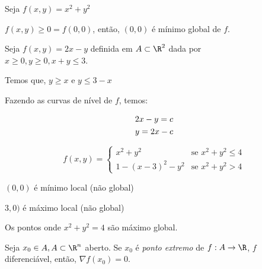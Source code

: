 \documentclass[11pt, oneside, a4paper]{gsm-l}
\begin{document}
\begin{exem}
Seja $f\left( {x,y} \right) = x^2  + y^2$
\end{exem}

\begin{sol}
$f\left( {x,y} \right) \geqslant 0 = f\left( {0,0} \right)$, então, $\left( {0,0} \right)$ é mínimo global de $f$.
\end{sol}

\begin{exem}
Seja $f\left( {x,y} \right) = 2x - y$ definida em $A \subset \R^2$ dada por \\
$x \geqslant 0,y \geqslant 0,x + y \leqslant 3$.
\end{exem}

\begin{sol}
Temos que, $y \geqslant x$ e $y \leqslant 3 - x$

Fazendo as curvas de nível de $f$, temos:

\[
\begin{gathered}
2x - y = c \hfill \\
y = 2x - c \hfill \\
\end{gathered}
\]


\end{sol}

\begin{exem}
\begin{equation*}
f(x,y)=\left\{ \begin{array}{cl}\displaystyle
x^2 + y^2 & \textrm{se }x^2 + y^2 \leqslant 4\\
        1 - \left( {x - 3} \right)^2  - y^2& \textrm{se } x^2 + y^2 > 4 \end{array}\right.
\end{equation*}

\end{exem}

\begin{sol}
$(0,0)$ é mínimo local (não global)

$3,0)$ é máximo local (não global)

Os pontos onde $x^2 + y^2 = 4$ são máximo global.


\end{sol}

\newpage 

\begin{teo}
Seja $x_0 \in A, A \subset \R^n$ aberto. Se $x_0$ é \textit{ponto extremo} de $f:A \to \R$, $f$ diferenciável, então, $\nabla f\left( {x_0 } \right) = 0$.
\end{teo}
\end{document}
